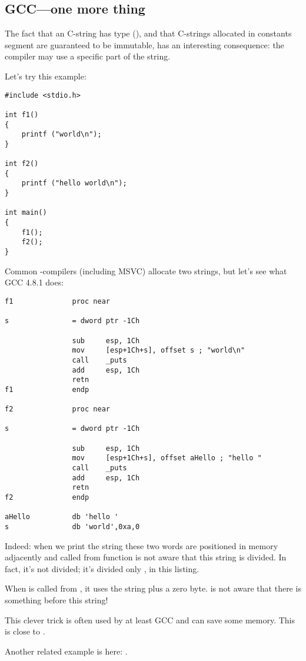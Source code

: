 \subsection{GCC---one more thing}
\label{use_parts_of_C_strings}

The fact that an  C-string has  type (), 
and that C-strings allocated in constants segment are guaranteed to be immutable, has an interesting consequence:
the compiler may use a specific part of the string.

Let's try this example:

\begin{lstlisting}[style=customc]
#include <stdio.h>

int f1()
{
	printf ("world\n");
}

int f2()
{
	printf ("hello world\n");
}

int main()
{
	f1();
	f2();
}
\end{lstlisting}

Common \CCpp{}-compilers (including MSVC) allocate two strings, but let's see what GCC 4.8.1 does:

\begin{lstlisting}[caption=GCC 4.8.1 + IDA listing,style=customasmx86]
f1              proc near

s               = dword ptr -1Ch

                sub     esp, 1Ch
                mov     [esp+1Ch+s], offset s ; "world\n"
                call    _puts
                add     esp, 1Ch
                retn
f1              endp

f2              proc near

s               = dword ptr -1Ch

                sub     esp, 1Ch
                mov     [esp+1Ch+s], offset aHello ; "hello "
                call    _puts
                add     esp, 1Ch
                retn
f2              endp

aHello          db 'hello '
s               db 'world',0xa,0
\end{lstlisting}

Indeed: when we print the  string
these two words are positioned in memory adjacently and \puts called from 
function is not aware that this string is divided. 
In fact, it's not divided; it's divided only , in this listing.

When \puts is called from , it uses the  string plus a zero byte. \puts is not aware that there is something before this string!

This clever trick is often used by at least GCC and can save some memory.
This is close to .

Another related example is here: .

